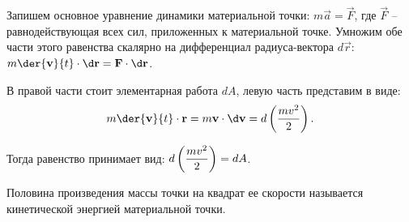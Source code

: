 Запишем основное уравнение динамики материальной точки:
\( m\vec{a} = \vec{F} \), где \( \vec{F} \) -- равнодействующая всех сил,
приложенных к материальной точке. Умножим обе части этого равенства скалярно на
дифференциал радиуса-вектора \( d\vec{r} \):
\( \ds m\der{\vec{v}}{t}\cdot\d\vec{r} = \vec{F}\cdot\d\vec{r} \).

В правой части стоит элементарная работа \( dA \), левую часть представим в
виде:
\[
    m\der{\vec{v}}{t}\cdot\vec{r} = m\vec{v}\cdot\d\vec{v} =
    d\left(\frac{mv^2}{2}\right).
\]
 
Тогда равенство принимает вид: \( \displaystyle d\left( \frac{mv^2}{2}\right) = dA \).

Половина произведения массы точки на квадрат ее скорости называется кинетической
энергией материальной точки.

\newpage
